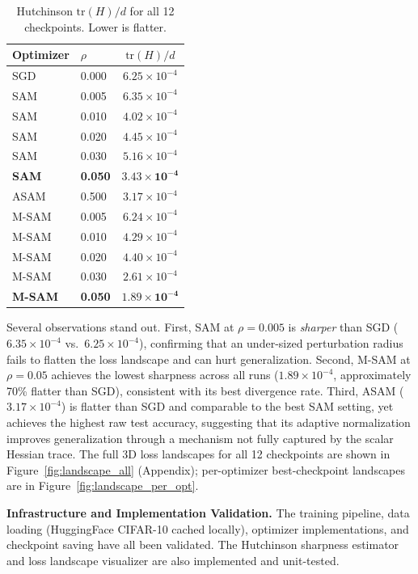 \documentclass{article}
\begin{document}
\begin{table}[H]
\begin{minipage}[t]{0.45\textwidth}
\centering
\caption{Hutchinson $\mathrm{tr}(H)/d$ for all 12 checkpoints. Lower is flatter.}
\label{tab:sharpness}
\begin{tabular}{llc}
\toprule
Optimizer & $\rho$ & $\mathrm{tr}(H)/d$ \\
\midrule
SGD      & 0.000 & $6.25 \times 10^{-4}$ \\
\midrule
SAM      & 0.005 & $6.35 \times 10^{-4}$ \\
SAM      & 0.010 & $4.02 \times 10^{-4}$ \\
SAM      & 0.020 & $4.45 \times 10^{-4}$ \\
SAM      & 0.030 & $5.16 \times 10^{-4}$ \\
\textbf{SAM} & \textbf{0.050} & $\mathbf{3.43 \times 10^{-4}}$ \\
\midrule
ASAM     & 0.500 & $3.17 \times 10^{-4}$ \\
\midrule
M-SAM    & 0.005 & $6.24 \times 10^{-4}$ \\
M-SAM    & 0.010 & $4.29 \times 10^{-4}$ \\
M-SAM    & 0.020 & $4.40 \times 10^{-4}$ \\
M-SAM    & 0.030 & $2.61 \times 10^{-4}$ \\
\textbf{M-SAM} & \textbf{0.050} & $\mathbf{1.89 \times 10^{-4}}$ \\
\bottomrule
\end{tabular}
\end{minipage}
\end{table}

Several observations stand out.  First, SAM at $\rho{=}0.005$ is \emph{sharper} than SGD ($6.35 \times 10^{-4}$ vs.\ $6.25 \times 10^{-4}$), confirming that an under-sized perturbation radius fails to flatten the loss landscape and can hurt generalization.  Second, M-SAM at $\rho{=}0.05$ achieves the lowest sharpness across all runs ($1.89 \times 10^{-4}$, approximately 70\% flatter than SGD), consistent with its best divergence rate.  Third, ASAM ($3.17 \times 10^{-4}$) is flatter than SGD and comparable to the best SAM setting, yet achieves the highest raw test accuracy, suggesting that its adaptive normalization improves generalization through a mechanism not fully captured by the scalar Hessian trace.  The full 3D loss landscapes for all 12 checkpoints are shown in Figure~\ref{fig:landscape_all} (Appendix); per-optimizer best-checkpoint landscapes are in Figure~\ref{fig:landscape_per_opt}.

\textbf{Infrastructure and Implementation Validation.}
The training pipeline, data loading (HuggingFace CIFAR-10 cached locally), optimizer implementations, and checkpoint saving have all been validated.  The Hutchinson sharpness estimator and loss landscape visualizer are also implemented and unit-tested.
\end{document}
